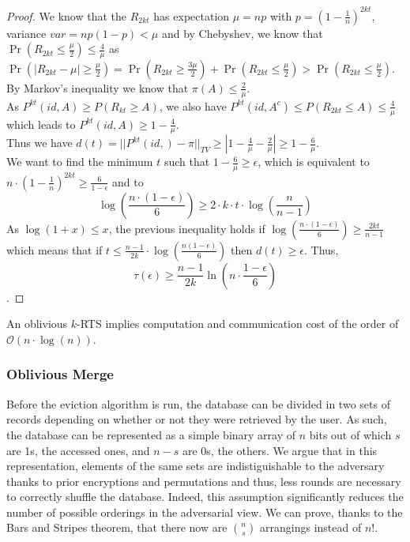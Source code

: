 \documentclass[english,oneside,twocolumn]{article}
\begin{document}
\begin{proof}
We know that the $R_{2kt}$ has expectation $\mu = np$  with $p=\left ( 1 - \frac{1}{n} \right )^{2kt}$, variance $var = np(1-p) <\mu$ and by Chebyshev, we know that $\Pr(R_{2kt}\leq \frac{\mu}{2})\leq \frac{4}{\mu}$
as $\Pr(|R_{2kt} - \mu|\geq \frac{\mu}{2}) = \Pr(R_{2kt} \geq \frac{3\mu}{2}) + \Pr(R_{2kt} \leq \frac{\mu}{2}) > \Pr(R_{2kt} \leq \frac{\mu}{2})$.\\

By Markov's inequality we know that $\pi(A) \leq \frac{2}{\mu}$.\\

As $P^{kt}(id,A) \geq P(R_{kt}\geq A) $, we also have $P^{kt}(id,A^c) \leq P(R_{2kt}\leq A) \leq \frac{4}{\mu} $ which leads to $P^{kt}(id,A)\geq1 - \frac{4}{\mu}$.\\

Thus we have $d(t)=||P^{kt}(id,) - \pi ||_{TV} \geq |1 - \frac{4}{\mu} - \frac{2}{\mu}| \geq 1 - \frac{6}{\mu}$.\\

We want to find the minimum $t$ such that $1-\frac{6}{\mu}\geq \epsilon$, which is equivalent to $n \cdot \left ( 1 - \frac{1}{n} \right )^{2kt} \geq \frac{6}{1-\epsilon}$ and to
$$\log\left(\frac{n\cdot (1-\epsilon)}{6}\right) \geq 2\cdot k\cdot t \cdot \log \left ( \frac{n}{n-1} \right )$$
As $\log(1+x) \leq x$, the previous inequality holds if $\log\left(\frac{n\cdot (1-\epsilon)}{6}\right) \geq   \frac{2kt}{n-1} $ which means that if $t\leq \frac{n-1}{2k}\cdot \log\left ( \frac{n(1-\epsilon)}{6}\right )$ then $d(t)\geq \epsilon$.
Thus,
$$\tau \left (\epsilon \right ) \geq \frac{n-1}{2k} \ln(n\cdot \frac{1-\epsilon}{6}) $$.
\end{proof}

An oblivious $k$-RTS implies computation and communication cost of the order of $\mathcal{O} \left(n\cdot \log(n)\right)$.

\subsubsection{Oblivious Merge}
Before the eviction algorithm is run, the database can be divided in two sets of records depending on whether or not they were retrieved by the user. As such, the database can be represented as a simple binary array of $n$ bits out of which $s$ are 1s, the accessed ones, and $n-s$ are 0s, the others.
We argue that in this representation, elements of the same sets are indistiguishable to the adversary thanks to prior encryptions and permutations and thus, less rounds are necessary to correctly shuffle the database.
Indeed, this assumption significantly reduces the number of possible orderings in the adversarial view. We can prove, thanks to the Bars and Stripes theorem, that there now are ${n \choose s}$ arrangings instead of $n!$.
\end{document}
